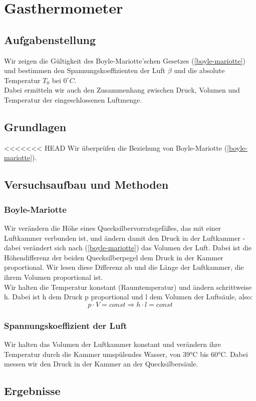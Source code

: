 \documentclass{article}
\begin{document}
\section{Gasthermometer}
\subsection{Aufgabenstellung}
Wir zeigen die Gültigkeit des Boyle-Mariotte'schen Gesetzes (\ref{boyle-mariotte}) und bestimmen den Spannungskoeffizienten der Luft $\beta$ und die absolute Temperatur $T_0$ bei $0^\circ C$.\\
Dabei ermitteln wir auch den Zusammenhang zwischen Druck, Volumen und Temperatur der eingeschlossenen Luftmenge.
\subsection{Grundlagen}
<<<<<<< HEAD
Wir überprüfen die Beziehung von Boyle-Mariotte (\ref{boyle-mariotte}).
\subsection{Versuchsaufbau und Methoden}
\subsubsection{Boyle-Mariotte}
Wir verändern die Höhe eines Quecksilbervorratsgefäßes, das mit einer Luftkammer verbunden ist, und ändern damit den Druck in der Luftkammer - dabei verändert sich nach (\ref{boyle-mariotte}) das Volumen der Luft. Dabei ist die Höhendifferenz der beiden Quecksilberpegel dem Druck in der Kammer proportional. Wir lesen diese Differenz ab und die Länge der Luftkammer, die ihrem Volumen proportional ist. \\
Wir halten die Temperatur konstant (Raumtemperatur) und ändern schrittweise h. Dabei ist h dem Druck p proportional und l dem Volumen der Luftsäule, also:
$$p\cdot V=const \Rightarrow h \cdot l=const$$

\subsubsection{Spannungskoeffizient der Luft}
Wir halten das Volumen der Luftkammer konstant und verändern ihre Temperatur durch die Kammer umspülendes Wasser, von 39°C bis 60°C. Dabei messen wir den Druck in der Kammer an der Quecksilbersäule. 
\subsection{Ergebnisse}
\end{document}
